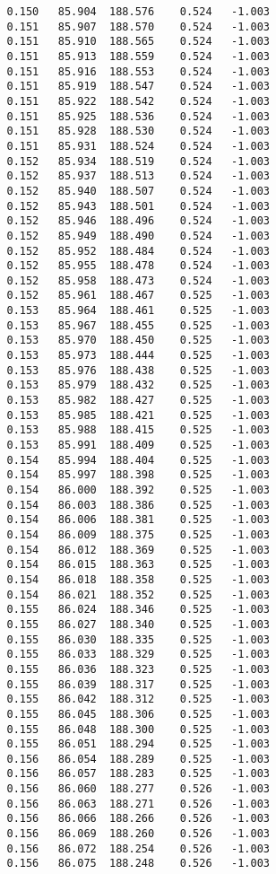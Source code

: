 \begin{verbatim}
   0.150   85.904  188.576    0.524   -1.003
   0.151   85.907  188.570    0.524   -1.003
   0.151   85.910  188.565    0.524   -1.003
   0.151   85.913  188.559    0.524   -1.003
   0.151   85.916  188.553    0.524   -1.003
   0.151   85.919  188.547    0.524   -1.003
   0.151   85.922  188.542    0.524   -1.003
   0.151   85.925  188.536    0.524   -1.003
   0.151   85.928  188.530    0.524   -1.003
   0.151   85.931  188.524    0.524   -1.003
   0.152   85.934  188.519    0.524   -1.003
   0.152   85.937  188.513    0.524   -1.003
   0.152   85.940  188.507    0.524   -1.003
   0.152   85.943  188.501    0.524   -1.003
   0.152   85.946  188.496    0.524   -1.003
   0.152   85.949  188.490    0.524   -1.003
   0.152   85.952  188.484    0.524   -1.003
   0.152   85.955  188.478    0.524   -1.003
   0.152   85.958  188.473    0.524   -1.003
   0.152   85.961  188.467    0.525   -1.003
   0.153   85.964  188.461    0.525   -1.003
   0.153   85.967  188.455    0.525   -1.003
   0.153   85.970  188.450    0.525   -1.003
   0.153   85.973  188.444    0.525   -1.003
   0.153   85.976  188.438    0.525   -1.003
   0.153   85.979  188.432    0.525   -1.003
   0.153   85.982  188.427    0.525   -1.003
   0.153   85.985  188.421    0.525   -1.003
   0.153   85.988  188.415    0.525   -1.003
   0.153   85.991  188.409    0.525   -1.003
   0.154   85.994  188.404    0.525   -1.003
   0.154   85.997  188.398    0.525   -1.003
   0.154   86.000  188.392    0.525   -1.003
   0.154   86.003  188.386    0.525   -1.003
   0.154   86.006  188.381    0.525   -1.003
   0.154   86.009  188.375    0.525   -1.003
   0.154   86.012  188.369    0.525   -1.003
   0.154   86.015  188.363    0.525   -1.003
   0.154   86.018  188.358    0.525   -1.003
   0.154   86.021  188.352    0.525   -1.003
   0.155   86.024  188.346    0.525   -1.003
   0.155   86.027  188.340    0.525   -1.003
   0.155   86.030  188.335    0.525   -1.003
   0.155   86.033  188.329    0.525   -1.003
   0.155   86.036  188.323    0.525   -1.003
   0.155   86.039  188.317    0.525   -1.003
   0.155   86.042  188.312    0.525   -1.003
   0.155   86.045  188.306    0.525   -1.003
   0.155   86.048  188.300    0.525   -1.003
   0.155   86.051  188.294    0.525   -1.003
   0.156   86.054  188.289    0.525   -1.003
   0.156   86.057  188.283    0.525   -1.003
   0.156   86.060  188.277    0.526   -1.003
   0.156   86.063  188.271    0.526   -1.003
   0.156   86.066  188.266    0.526   -1.003
   0.156   86.069  188.260    0.526   -1.003
   0.156   86.072  188.254    0.526   -1.003
   0.156   86.075  188.248    0.526   -1.003

\end{verbatim}
